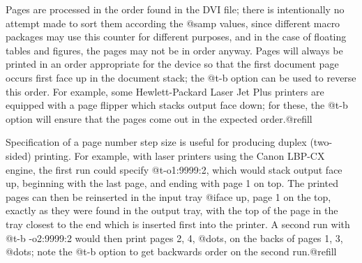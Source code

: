 Pages are processed in the order found in the DVI file;
there is intentionally no attempt made to sort them
according the @samp{} values, since different
macro packages may use this counter for different
purposes, and in the case of floating tables and
figures, the pages may not be in order anyway.  Pages
will always be printed in an order appropriate for the
device so that the first document page occurs first face
up in the document stack; the @t{-b} option can be used
to reverse this order.  For example, some
Hewlett-Packard Laser Jet Plus printers are equipped
with a page flipper which stacks output face down; for
these, the @t{-b} option will ensure that the pages come
out in the expected order.@refill

Specification of a page number step size is useful for
producing duplex (two-sided) printing.  For example, with
laser printers using the Canon LBP-CX engine, the first run
could specify @t{-o1:9999:2}, which would stack output face
up, beginning with the last page, and ending with page 1 on
top.  The printed pages can then be reinserted in the input
tray @i{face up}, page 1 on the top, exactly as they were
found in the output tray, with the top of the page in the
tray closest to the end which is inserted first into the
printer.  A second run with @t{-b -o2:9999:2} would then
print pages 2, 4, @dots{}, on the backs of pages 1, 3,
@dots{}; note the @t{-b} option to get backwards order on the
second run.@refill

